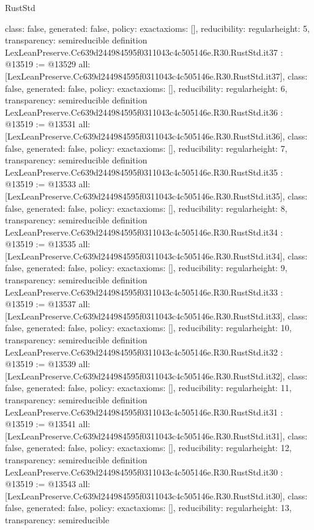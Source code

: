 \begin{lexlean}{RustStd}
\begin{coremodule}
{  class: false,
  generated: false,
  policy: exact{axioms: []},
  reducibility: regular{height: 5},
  transparency: semireducible
}
definition LexLeanPreserve.Cc639d244984595f0311043c4c505146e.R30.RustStd.it37 : @13519 := @13529 {
  all: [LexLeanPreserve.Cc639d244984595f0311043c4c505146e.R30.RustStd.it37],
  class: false,
  generated: false,
  policy: exact{axioms: []},
  reducibility: regular{height: 6},
  transparency: semireducible
}
definition LexLeanPreserve.Cc639d244984595f0311043c4c505146e.R30.RustStd.it36 : @13519 := @13531 {
  all: [LexLeanPreserve.Cc639d244984595f0311043c4c505146e.R30.RustStd.it36],
  class: false,
  generated: false,
  policy: exact{axioms: []},
  reducibility: regular{height: 7},
  transparency: semireducible
}
definition LexLeanPreserve.Cc639d244984595f0311043c4c505146e.R30.RustStd.it35 : @13519 := @13533 {
  all: [LexLeanPreserve.Cc639d244984595f0311043c4c505146e.R30.RustStd.it35],
  class: false,
  generated: false,
  policy: exact{axioms: []},
  reducibility: regular{height: 8},
  transparency: semireducible
}
definition LexLeanPreserve.Cc639d244984595f0311043c4c505146e.R30.RustStd.it34 : @13519 := @13535 {
  all: [LexLeanPreserve.Cc639d244984595f0311043c4c505146e.R30.RustStd.it34],
  class: false,
  generated: false,
  policy: exact{axioms: []},
  reducibility: regular{height: 9},
  transparency: semireducible
}
definition LexLeanPreserve.Cc639d244984595f0311043c4c505146e.R30.RustStd.it33 : @13519 := @13537 {
  all: [LexLeanPreserve.Cc639d244984595f0311043c4c505146e.R30.RustStd.it33],
  class: false,
  generated: false,
  policy: exact{axioms: []},
  reducibility: regular{height: 10},
  transparency: semireducible
}
definition LexLeanPreserve.Cc639d244984595f0311043c4c505146e.R30.RustStd.it32 : @13519 := @13539 {
  all: [LexLeanPreserve.Cc639d244984595f0311043c4c505146e.R30.RustStd.it32],
  class: false,
  generated: false,
  policy: exact{axioms: []},
  reducibility: regular{height: 11},
  transparency: semireducible
}
definition LexLeanPreserve.Cc639d244984595f0311043c4c505146e.R30.RustStd.it31 : @13519 := @13541 {
  all: [LexLeanPreserve.Cc639d244984595f0311043c4c505146e.R30.RustStd.it31],
  class: false,
  generated: false,
  policy: exact{axioms: []},
  reducibility: regular{height: 12},
  transparency: semireducible
}
definition LexLeanPreserve.Cc639d244984595f0311043c4c505146e.R30.RustStd.it30 : @13519 := @13543 {
  all: [LexLeanPreserve.Cc639d244984595f0311043c4c505146e.R30.RustStd.it30],
  class: false,
  generated: false,
  policy: exact{axioms: []},
  reducibility: regular{height: 13},
  transparency: semireducible
}
\end{coremodule}
\end{lexlean}
